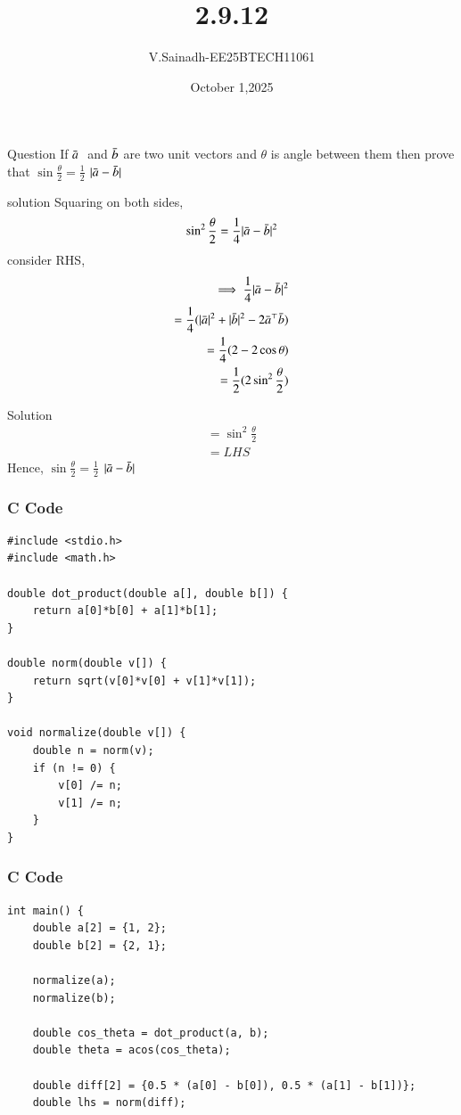 \documentclass{beamer}
\begin{document}
\title 
{2.9.12}
\date{October 1,2025}
\author 
{V.Sainadh-EE25BTECH11061}
\frame{\titlepage}
\begin{frame}{Question}
If $\Bar{a} \;$ and \;$ \Bar{b} $ are two unit vectors and $\theta$ is angle between them then prove that $\sin\frac{\theta}{2}=\frac{1}{2}$ $| {\Bar{a}-\Bar{b}}|$
\end{frame}
\begin{frame}{solution}
Squaring on both sides,\\
\begin{align*}
    \sin^2\frac{\theta}{2}=\frac{1}{4}| {\Bar{a}-\Bar{b}}|^2\\
    \end{align*}
  consider RHS,\\
\begin{align}
 \implies \frac{1}{4}| {\Bar{a}-\Bar{b}}|^2\\
  =\frac{1}{4}( |\Bar{a}|^2+|\Bar{b}|^2-2\Bar{a}^\top\Bar{b})\\
  =\frac{1}{4}(2-2\cos \theta)\\
  =\frac{1}{2}(2\sin^2{\frac{\theta}{2}})\\
  \end{align}
  \end{frame}
  \begin{frame}{Solution}
  \begin{align}
=\sin^2\frac{\theta}{2}\\
=LHS
\end{align}
Hence, $\sin\frac{\theta}{2}=\frac{1}{2}$  $| {\Bar{a}-\Bar{b}}|
$ 
\end{frame}
 
\begin{frame}[fragile]
\frametitle{C Code }
\begin{lstlisting}
#include <stdio.h>
#include <math.h>

double dot_product(double a[], double b[]) {
    return a[0]*b[0] + a[1]*b[1];
}

double norm(double v[]) {
    return sqrt(v[0]*v[0] + v[1]*v[1]);
}

void normalize(double v[]) {
    double n = norm(v);
    if (n != 0) {
        v[0] /= n;
        v[1] /= n;
    }
}
\end{lstlisting}
\end{frame}

\begin{frame}[fragile]
    \frametitle{C Code}
    \begin{lstlisting}
int main() {
    double a[2] = {1, 2};
    double b[2] = {2, 1};

    normalize(a);
    normalize(b);

    double cos_theta = dot_product(a, b);
    double theta = acos(cos_theta); 

    double diff[2] = {0.5 * (a[0] - b[0]), 0.5 * (a[1] - b[1])};
    double lhs = norm(diff);
\end{lstlisting}
\end{frame}
\end{document}
